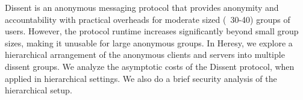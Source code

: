 Dissent is an anonymous messaging protocol that provides anonymity and accountability with practical overheads for moderate sized (~30-40) groups of users. However, the protocol runtime increases significantly beyond small group sizes, making it unusable for large anonymous groups. In Heresy, we explore a hierarchical arrangement of the anonymous clients and servers into multiple dissent groups. We analyze the asymptotic costs of the Dissent protocol, when applied in hierarchical settings. We also do a brief security analysis of the hierarchical setup.